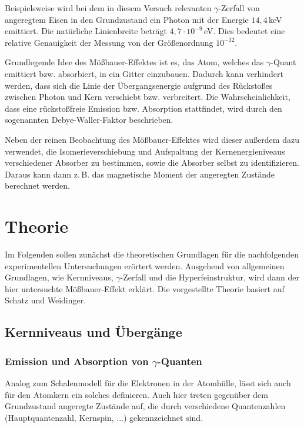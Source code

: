 \documentclass[
a4paper,                %
titlepage=firstiscover, %
captions=tableheading,  %
toc=bibliography,       %
toc=listof,             %
oneside,                %
automark,               %
12pt,                   %
english, ngerman,       %
parskip = half,         %
]{scrartcl}
\begin{document}
Beispielsweise wird bei dem in diesem Versuch relevanten $\gamma$-Zerfall von angeregtem Eisen in den Grundzustand ein Photon mit der Energie $14,4\,$keV emittiert.
Die natürliche Linienbreite beträgt $4,7\cdot 10^{-9}\,$eV.
Dies bedeutet eine relative Genauigkeit der Messung von der Größenordnung $10^{-12}$.\cite{2}

Grundlegende Idee des Mößbauer-Effektes ist es, das Atom, welches das $\gamma$-Quant emittiert bzw. absorbiert, in ein Gitter einzubauen.
Dadurch kann verhindert werden, dass sich die Linie der Übergangsenergie aufgrund des Rückstoßes zwischen Photon und Kern verschiebt bzw. verbreitert.
Die Wahrscheinlichkeit, dass eine rückstoßfreie Emission bzw. Absorption stattfindet, wird durch den sogenannten Debye-Waller-Faktor beschrieben.

Neben der reinen Beobachtung des Mößbauer-Effektes wird dieser außerdem dazu verwendet, die Isomerieverschiebung und Aufspaltung der Kernenergieniveaus verschiedener Absorber zu bestimmen, sowie die Absorber selbst zu identifizieren.
Daraus kann dann z.\,B. das magnetische Moment der angeregten Zustände berechnet werden.


\newpage


\section{Theorie}

Im Folgenden sollen zunächst die theoretischen Grundlagen für die nachfolgenden experimentellen Untersuchungen erörtert werden.
Ausgehend von allgemeinen Grundlagen, wie Kernniveaus, $\gamma$-Zerfall und die Hyperfeinstruktur, wird dann der hier untersuchte Mößbauer-Effekt erklärt.
Die vorgestellte Theorie basiert auf Schatz und Weidinger.\cite{2}


\subsection{Kernniveaus und Übergänge}


\subsubsection{Emission und Absorption von $\gamma$-Quanten}

Analog zum Schalenmodell für die Elektronen in der Atomhülle, lässt sich auch für den Atomkern ein solches definieren.
Auch hier treten gegenüber dem Grundzustand angeregte Zustände auf, die durch verschiedene Quantenzahlen (Hauptquantenzahl, Kernspin, ...) gekennzeichnet sind.
\end{document}
